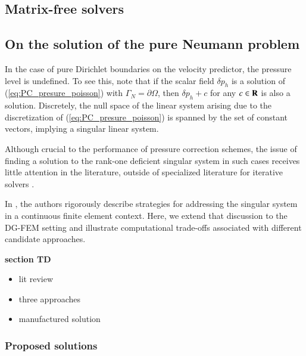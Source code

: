 \subsection{Matrix-free solvers}%
\label{sec:numerical_expeiments:matrix_free}


\subsection{On the solution of the pure Neumann problem}

In the case of pure Dirichlet boundaries on the velocity predictor, the pressure level is undefined. 
To see this, note that if the scalar field $\delta p_h$ is a solution of (\ref{eq:PC_presure_poisson}) with $\Gamma_N = \partial \Omega$, then $\delta p_h + c$ for any $c \in {\mbox{\bf R}}$ is also a solution. 
Discretely, the null space of the linear system arising due to the discretization of (\ref{eq:PC_presure_poisson}) is spanned by the set of constant vectors, implying a singular linear system.

Although crucial to the performance of pressure correction schemes, the issue of finding a solution to the rank-one deficient singular system in such cases receives little attention in the literature, outside of specialized literature for iterative solvers \cite{axelsson_iterative_1996,iankov_finite_2013}.

In \cite{bochev_finite_2005}, the authors rigorously describe strategies for addressing the singular system in a continuous finite element context. 
Here, we extend that discussion to the DG-FEM setting and illustrate computational trade-offs associated with different candidate approaches.


\textbf{section TD}
\begin{itemize}[itemsep=1pt]
  \item lit review
  \item three approaches
  \item manufactured solution
\end{itemize}

\subsubsection{Proposed solutions}%

